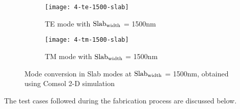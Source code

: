 \documentclass[../report.tex]{subfiles}
\begin{document}
\begin{figure}[H] %
	\begin{subfigure}[t]{0.45\textwidth}
		\texttt{[image: 4-te-1500-slab]}
		\caption{TE mode with $\mathrm{Slab_{width}}$ = 1500nm}
		\label{fig:4_te_1500_slab}
	\end{subfigure}
	\hfill
	\begin{subfigure}[t]{0.45\textwidth}
		\texttt{[image: 4-tm-1500-slab]}
		\caption{TM mode with $\mathrm{Slab_{width}}$ = 1500nm}
		\label{fig:4_tm_1500_slab}
	\end{subfigure}
	\caption{Mode conversion in Slab modes at $\mathrm{Slab_{width}}$ = 1500nm, obtained using Comsol 2-D simulation}
\end{figure}

\noindent The test cases followed during the fabrication process are discussed below. 
\end{document}
